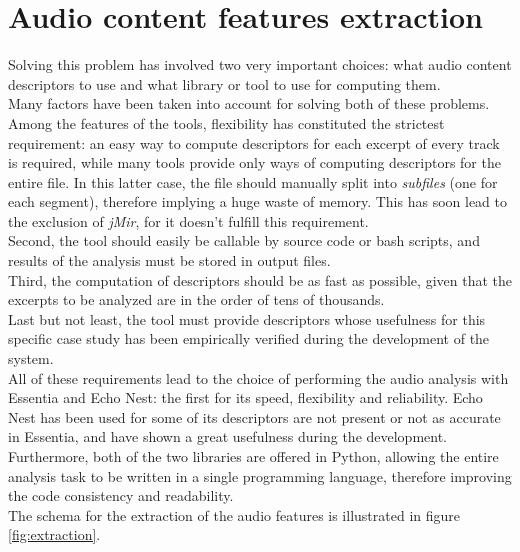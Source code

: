 \section{Audio content features extraction}
Solving this problem has involved two very important choices: what audio content descriptors to use and what library or tool to use for computing them. \\Many factors have been taken into account for solving both of these problems.\\ Among the features of the tools, flexibility has constituted the strictest requirement: an easy way to compute descriptors for each excerpt of every track is required, while many tools provide only ways of computing descriptors for the entire file. In this latter case, the file should manually split into \textit{subfiles} (one for each segment), therefore implying a huge waste of memory. This has soon lead to the exclusion of \textit{jMir}, for it doesn't fulfill this requirement. \\ 
Second, the tool should easily be callable by source code or bash scripts, and results of the analysis must be stored in output files. \\
Third, the computation of descriptors should be as fast as possible, given that the excerpts to be analyzed are in the order of tens of thousands. \\
Last but not least, the tool must provide descriptors whose usefulness for this specific case study has been empirically verified during the development of the system.\\
All of these requirements lead to the choice of performing the audio analysis with Essentia and Echo Nest: the first for its speed, flexibility and reliability. Echo Nest has been used for some of its descriptors are not present or not as accurate in Essentia, and have shown a great usefulness during the development. \\ Furthermore, both of the two libraries are offered in Python, allowing the entire analysis task to be written in a single programming language, therefore improving the code consistency and readability. \\
The schema for the extraction of the audio features is illustrated in figure \ref{fig:extraction}. \\ 
